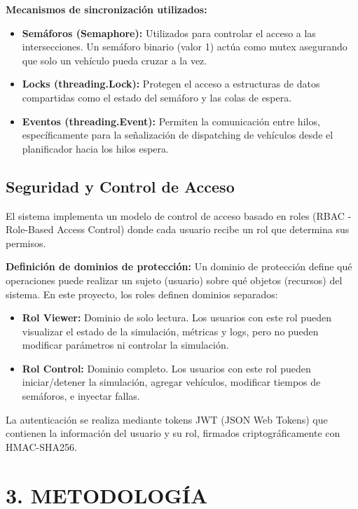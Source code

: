 \documentclass[12pt,a4paper]{article}
\begin{document}
\textbf{Mecanismos de sincronización utilizados:}
\begin{itemize}
    \item \textbf{Semáforos (Semaphore):} Utilizados para controlar el acceso a las intersecciones. Un semáforo binario (valor 1) actúa como mutex asegurando que solo un vehículo pueda cruzar a la vez.
    \item \textbf{Locks (threading.Lock):} Protegen el acceso a estructuras de datos compartidas como el estado del semáforo y las colas de espera.
    \item \textbf{Eventos (threading.Event):} Permiten la comunicación entre hilos, específicamente para la señalización de dispatching de vehículos desde el planificador hacia los hilos espera.
\end{itemize}

\subsection{Seguridad y Control de Acceso}

El sistema implementa un modelo de control de acceso basado en roles (RBAC - Role-Based Access Control) donde cada usuario recibe un rol que determina sus permisos.

\textbf{Definición de dominios de protección:} Un dominio de protección define qué operaciones puede realizar un sujeto (usuario) sobre qué objetos (recursos) del sistema. En este proyecto, los roles definen dominios separados:

\begin{itemize}
    \item \textbf{Rol Viewer:} Dominio de solo lectura. Los usuarios con este rol pueden visualizar el estado de la simulación, métricas y logs, pero no pueden modificar parámetros ni controlar la simulación.
    \item \textbf{Rol Control:} Dominio completo. Los usuarios con este rol pueden iniciar/detener la simulación, agregar vehículos, modificar tiempos de semáforos, e inyectar fallas.
\end{itemize}

La autenticación se realiza mediante tokens JWT (JSON Web Tokens) que contienen la información del usuario y su rol, firmados criptográficamente con HMAC-SHA256.

\newpage

\section{3. METODOLOGÍA}
\end{document}

